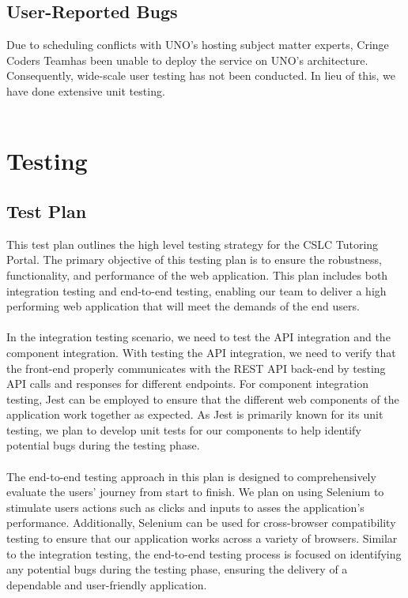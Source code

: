 \documentclass[oneside,openany,obeyspaces]{book}
\newcommand\tab[1][1cm]{\hspace*{#1}}
\newcommand\TeamName{Cringe Coders Team}
\begin{document}
\begin{flushleft}
    \section{User-Reported Bugs}

    \tab Due to scheduling conflicts with UNO's hosting subject matter experts, \TeamName\space has been unable to deploy the service on UNO's architecture. Consequently, wide-scale user testing has not been conducted. In lieu of this, we have done extensive unit testing.\\~\\




    \chapter{Testing}

    \section{Test Plan}
    \tab This test plan outlines the high level testing strategy for the CSLC Tutoring Portal. The primary objective of this testing plan is to ensure the robustness, functionality, and performance of the web application. This plan includes both integration testing and end-to-end testing, enabling our team to deliver a high performing web application that will meet the demands of the end users.\\~\\

    \tab In the integration testing scenario, we need to test the API integration and the component integration. With testing the API integration, we need to verify that the front-end properly communicates with the REST API back-end by testing API calls and responses for different endpoints. For component integration testing, Jest can be employed to ensure that the different web components of the application work together as expected. As Jest is primarily known for its unit testing, we plan to develop unit tests for our components to help identify potential bugs during the testing phase.\\~\\

    \tab The end-to-end testing approach in this plan is designed to comprehensively evaluate the users' journey from start to finish. We plan on using Selenium to stimulate users actions such as clicks and inputs to asses the application's performance. Additionally, Selenium can be used for cross-browser compatibility testing to ensure that our application works across a variety of browsers. Similar to the integration testing, the end-to-end testing process is focused on identifying any potential bugs during the testing phase, ensuring the delivery of a dependable and user-friendly application.\\~\\



\end{flushleft}
\end{document}
